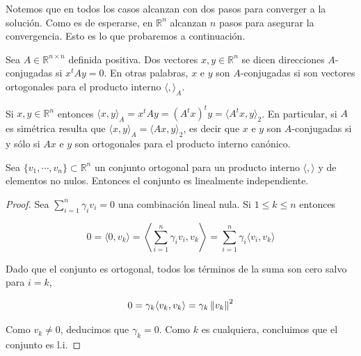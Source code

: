 Notemos que en todos los casos alcanzan con dos pasos para converger a la solución. Como es de esperarse, en $\mathbb{R}^n$ alcanzan $n$ pasos para asegurar la convergencia. Esto es lo que probaremos a continuación.

\begin{defi}
Sea $A \in \mathbb{R}^{n \times n}$ definida positiva. Dos vectores $x, y \in \mathbb{R}^n$ se dicen direcciones $A$-conjugadas si $x^t A y = 0$. En otras palabras, $x$ e $y$ son $A$-conjugadas si son vectores ortogonales para el producto interno $\langle,\rangle_A$.
\end{defi}

\begin{obs}
Si $x, y \in \mathbb{R}^n$ entonces $\langle x, y \rangle_A = x^t A y = (A^t x)^t y = \langle A^t x, y \rangle_2$. En particular, si $A$ es simétrica resulta que $\langle x, y \rangle_A = \langle Ax, y \rangle_2$, es decir que $x$ e $y$ son $A$-conjugadas si y sólo si $Ax$ e $y$ son ortogonales para el producto interno canónico.
\end{obs}

\begin{lema}
Sea $\{v_1, \cdots, v_n\} \subset \mathbb{R}^n$ un conjunto ortogonal para un producto interno $\langle, \rangle$ y de elementos no nulos. Entonces el conjunto es linealmente independiente.

\begin{proof}
Sea $\sum_{i = 1}^n \gamma_i v_i = 0$ una combinación lineal nula. Si $1 \leq k \leq n$ entonces

\[0 = \langle 0, v_k \rangle = \left\langle \sum_{i = 1}^n \gamma_i v_i, v_k \right\rangle = \sum_{i = 1}^n \gamma_i \langle v_i, v_k \rangle\]

Dado que el conjunto es ortogonal, todos los términos de la suma son cero salvo para $i = k$,

\[0 = \gamma_k \langle v_k, v_k \rangle = \gamma_k \left\lVert v_k\right\rVert^2\]

Como $v_k \neq 0$, deducimos que $\gamma_k = 0$. Como $k$ es cualquiera, concluimos que el conjunto es l.i.
\end{proof}
\end{lema}

